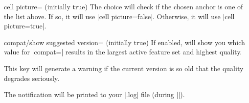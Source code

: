 {\begin{pgfplotskey}{cell picture= (initially true)}
    The choice  will check if the chosen anchor is
    one of the list above. If so, it will use |cell picture=false|. Otherwise,
    it will use |cell picture=true|.
\end{pgfplotskey}

\begin{pgfplotskey}{compat/show suggested version= (initially true)}
    If enabled, \PGFPlots{} will show you which value for
    |compat=| results in the largest active feature set and
    highest quality.

    This key will generate a warning if the current version is so old that the
    quality degrades seriously.

    The notification will be printed to your |.log| file (during
    ||).
\end{pgfplotskey}

}
